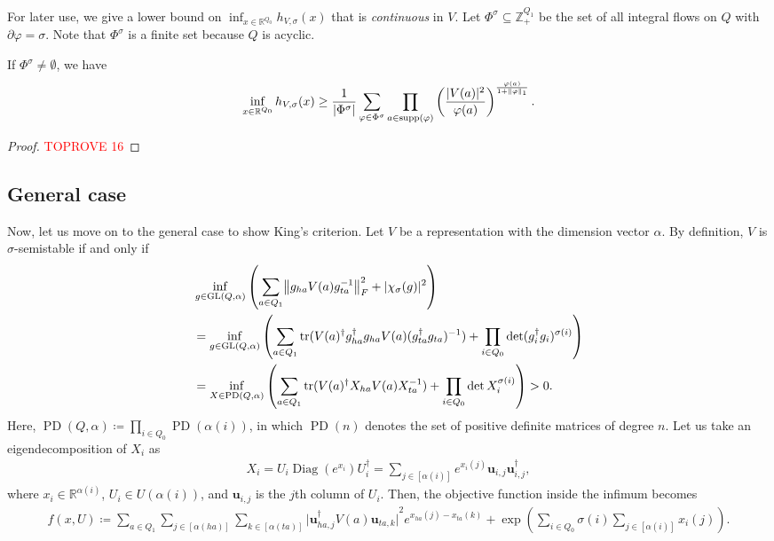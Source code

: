 \documentclass[a4paper,11pt]{article}
\numberwithin{equation}{section}
\newcommand{\R}{\mathbb{R}}
\newcommand{\Z}{\mathbb{Z}}
\newcommand{\bu}{\mathbf{u}}
\DeclareMathOperator{\GL}{GL}
\DeclareMathOperator{\PD}{PD}
\DeclareMathOperator{\tr}{tr}
\DeclareMathOperator{\supp}{supp}
\DeclareMathOperator{\Diag}{Diag}
\DeclarePairedDelimiter{\norm}{\lVert}{\rVert}
\DeclarePairedDelimiter{\abs}{\lvert}{\rvert}
\begin{document}
For later use, we give a lower bound on $\inf_{x \in \R^{Q_0}} h_{V, \sigma}(x)$ that is \emph{continuous} in $V$.
Let $\Phi^\sigma \subseteq \Z_+^{Q_1}$ be the set of all integral flows on $Q$ with $\partial \varphi = \sigma$.
Note that $\Phi^\sigma$ is a finite set because $Q$ is acyclic.

\begin{lemma}\label{lem:h-lower}
    If $\Phi^\sigma \ne \emptyset$, we have
    \begin{align}
        \inf_{x \in \R^{Q_0}} h_{V, \sigma}(x) \ge \frac{1}{|\Phi^\sigma|} \sum_{\varphi \in \Phi^\sigma} \prod_{a \in \supp(\varphi)} \left( \frac{|V(a)|^2}{\varphi(a)} \right)^{\frac{\varphi(a)}{1 + \norm{\varphi}_1}}.
    \end{align}
\end{lemma}

\begin{proof}\textcolor{red}{TOPROVE 16}\end{proof}


\subsection{General case}

Now, let us move on to the general case to show King's criterion. 
Let $V$ be a representation with the dimension vector $\alpha$.
By definition, $V$ is $\sigma$-semistable if and only if
\begin{align}
    &\inf_{g \in \GL(Q, \alpha)} 
    \left( \sum_{a \in Q_1} \norm*{g_{ha}V(a)g_{ta}^{-1}}_F^2 + \abs{\chi_\sigma(g)}^2 \right) \\
    &=\inf_{g \in \GL(Q, \alpha)}\left( \sum_{a \in Q_1} \tr(V(a)^\dagger g_{ha}^\dagger g_{ha} V(a) (g_{ta}^\dagger g_{ta})^{-1}) + \prod_{i \in Q_0} \det (g_i^\dagger g_i)^{\sigma(i)} \right) \\
    &=\inf_{X \in \PD(Q, \alpha)}\left( \sum_{a \in Q_1} \tr(V(a)^\dagger X_{ha} V(a) X_{ta}^{-1}) + \prod_{i \in Q_0} \det X_i^{\sigma(i)} \right) > 0.
\end{align}
Here, $\PD(Q, \alpha) \coloneqq \prod_{i \in Q_0} \PD(\alpha(i))$, in which $\PD(n)$ denotes the set of positive definite matrices of degree $n$.
Let us take an eigendecomposition of $X_i$ as
\begin{align}
    X_i = U_i \Diag(e^{x_i}) U_i^\dagger = \sum_{j \in [\alpha(i)]} e^{x_{i}(j)} \bu_{i,j} \bu_{i,j}^\dagger,
\end{align}
where $x_i \in \R^{\alpha(i)}$, $U_i \in U(\alpha(i))$, and $\bu_{i,j}$ is the $j$th column of $U_i$.
Then, the objective function inside the infimum becomes
\begin{align}
    f(x, U) \coloneqq \sum_{a \in Q_1} \sum_{j \in [\alpha(ha)]} \sum_{k \in [\alpha(ta)]} {\bigl| \bu_{ha,j}^\dagger V(a) \bu_{ta,k} \bigr|}^2 e^{x_{ha}(j) - x_{ta}(k)} + \exp\left(\sum_{i \in Q_0} \sigma(i) \sum_{j \in [\alpha(i)]} x_{i}(j) \right).
\end{align}
\end{document}
